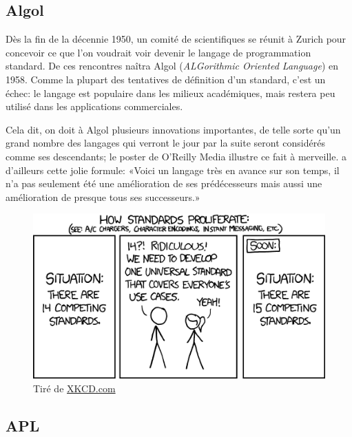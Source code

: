 \subsection{Algol}
\label{sec:informatique:historique:algol}

Dès la fin de la décennie 1950, un comité de scientifiques se réunit à
Zurich pour concevoir ce que l'on voudrait voir devenir le langage de
programmation standard. De ces rencontres naîtra Algol
(\emph{ALGorithmic Oriented Language}) en 1958. Comme la plupart des
tentatives de définition d'un standard, c'est un échec: le langage est
populaire dans les milieux académiques, mais restera peu utilisé dans
les applications commerciales.

Cela dit, on doit à Algol plusieurs innovations importantes, de telle
sorte qu'un grand nombre des langages qui verront le jour par la suite
seront considérés comme ses descendants; le poster
 de O'Reilly Media illustre ce fait à
merveille. \citet{Hoare:1973} a d'ailleurs cette jolie formule: «Voici
un langage très en avance sur son temps, il n'a pas seulement été une
amélioration de ses prédécesseurs mais aussi une amélioration de
presque tous ses successeurs.»

\begin{figure}[t]
  \centering
  \begin{minipage}{0.9\linewidth}
    \includegraphics{standards} \\
    \footnotesize\sffamily%
    Tiré de \href{http://xkcd.com/927/}{XKCD.com}
  \end{minipage}
\end{figure}

\subsection{APL}
\label{sec:informatique:historique:apl}


